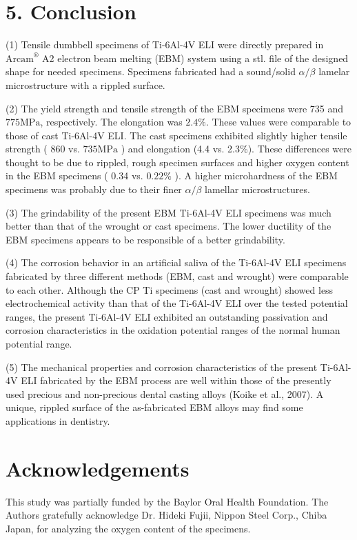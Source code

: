 \documentclass[10pt]{article}
\begin{document}
\section*{5. Conclusion}
(1) Tensile dumbbell specimens of Ti-6Al-4V ELI were directly prepared in $\mathrm{Arcam}^{\circledR}$ A2 electron beam melting (EBM) system using a stl. file of the designed shape for needed specimens. Specimens fabricated had a sound/solid $\alpha / \beta$ lamelar microstructure with a rippled surface.

(2) The yield strength and tensile strength of the EBM specimens were 735 and $775 \mathrm{MPa}$, respectively. The elongation was $2.4 \%$. These values were comparable to those of cast Ti-6Al-4V ELI. The cast specimens exhibited slightly higher tensile strength ( 860 vs. $735 \mathrm{MPa}$ ) and elongation (4.4 vs. 2.3\%). These differences were thought to be due to rippled, rough specimen surfaces and higher oxygen content in the EBM specimens ( 0.34 vs. $0.22 \%$ ). A higher microhardness of the EBM specimens was probably due to their finer $\alpha / \beta$ lamellar microstructures.

(3) The grindability of the present EBM Ti-6Al-4V ELI specimens was much better than that of the wrought or cast specimens. The lower ductility of the EBM specimens appears to be responsible of a better grindability.

(4) The corrosion behavior in an artificial saliva of the Ti-6Al-4V ELI specimens fabricated by three different methods (EBM, cast and wrought) were comparable to each other. Although the CP Ti specimens (cast and wrought) showed less electrochemical activity than that of the Ti-6Al-4V ELI over the tested potential ranges, the present Ti-6Al-4V ELI exhibited an outstanding passivation and corrosion characteristics in the oxidation potential ranges of the normal human potential range.

(5) The mechanical properties and corrosion characteristics of the present Ti-6Al-4V ELI fabricated by the EBM process are well within those of the presently used precious and non-precious dental casting alloys (Koike et al., 2007). A unique, rippled surface of the as-fabricated EBM alloys may find some applications in dentistry.

\section*{Acknowledgements}
This study was partially funded by the Baylor Oral Health Foundation. The Authors gratefully acknowledge Dr. Hideki Fujii, Nippon Steel Corp., Chiba Japan, for analyzing the oxygen content of the specimens.
\end{document}
